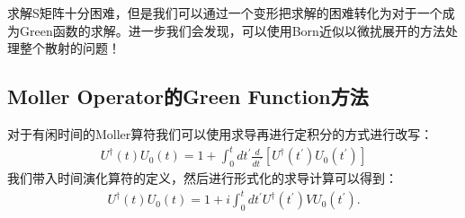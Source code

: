 

求解S矩阵十分困难，但是我们可以通过一个变形把求解的困难转化为对于一个成为Green函数的求解。进一步我们会发现，可以使用Born近似以微扰展开的方法处理整个散射的问题！

\subsection{Moller Operator的Green Function方法}


对于有闲时间的Moller算符我们可以使用求导再进行定积分的方式进行改写：
\begin{align}
  U^\dagger(t)U_0(t)=1+\int_0^tdt^{\prime}\frac{d}{dt^{\prime}}\left[U^\dagger(t^{\prime})U_0(t^{\prime})\right]
\end{align}
我们带入时间演化算符的定义，然后进行形式化的求导计算可以得到：
\begin{align}
  U^\dagger(t)U_0(t)
  =1+i\int_0^tdt^{\prime}U^{\dagger}(t^{\prime})VU_0(t^{\prime}).
\end{align}

\bigskip
{}

